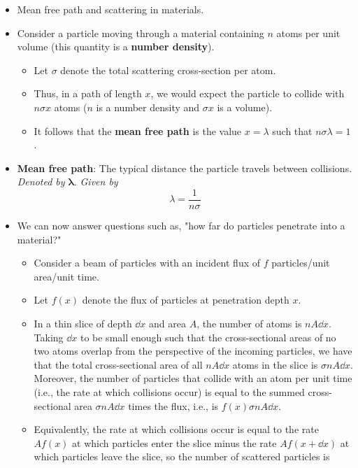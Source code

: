 \documentclass[../notes.tex]{subfiles}
\begin{document}
\begin{itemize}
\begin{itemize}
\begin{itemize}
        \end{itemize}
    \end{itemize}
    \item Mean free path and scattering in materials.
    \item Consider a particle moving through a material containing $n$ atoms per unit volume (this quantity is a \textbf{number density}).
    \begin{itemize}
        \item Let $\sigma$ denote the total scattering cross-section per atom.
        \item Thus, in a path of length $x$, we would expect the particle to collide with $n\sigma x$ atoms ($n$ is a number density and $\sigma x$ is a volume).
        \item It follows that the \textbf{mean free path} is the value $x=\lambda$ such that $n\sigma\lambda=1$.
    \end{itemize}
    \item \textbf{Mean free path}: The typical distance the particle travels between collisions. \emph{Denoted by} $\bm{\lambda}$. \emph{Given by}
    \begin{equation*}
        \lambda = \frac{1}{n\sigma}
    \end{equation*}
    \item We can now answer questions such as, "how far do particles penetrate into a material?"
    \begin{itemize}
        \item Consider a beam of particles with an incident flux of $f$ particles/unit area/unit time.
        \item Let $f(x)$ denote the flux of particles at penetration depth $x$.
        \item In a thin slice of depth $\dd{x}$ and area $A$, the number of atoms is $nA\dd{x}$. Taking $\dd{x}$ to be small enough such that the cross-sectional areas of no two atoms overlap from the perspective of the incoming particles, we have that the total cross-sectional area of all $nA\dd{x}$ atoms in the slice is $\sigma nA\dd{x}$. Moreover, the number of particles that collide with an atom per unit time (i.e., the rate at which collisions occur) is equal to the summed cross-sectional area $\sigma nA\dd{x}$ times the flux, i.e., is $f(x)\sigma nA\dd{x}$.
        \item Equivalently, the rate at which collisions occur is equal to the rate $Af(x)$ at which particles enter the slice minus the rate $Af(x+\dd{x})$ at which particles leave the slice, so the number of scattered particles is

\end{itemize}
\end{itemize}
\end{document}
